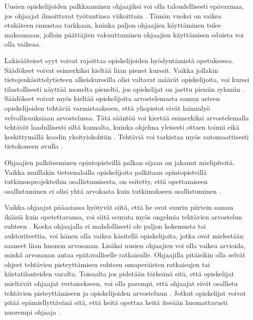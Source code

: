 \documentclass[finnish]{tktltiki2}
\theoremstyle{definition}
\theoremstyle{remark}
\begin{document}
Uusien opiskelijoiden palkkaaminen ohjaajiksi voi olla taloudellisesti epävarmaa, jos ohjaajat ilmoittavat työtuntinsa viikoittain \cite{Reges03}. Tämän vuoksi on vaikea etukäteen ennustaa tarkkaan, kuinka paljon ohjaajien käyttäminen tulee maksamaan, jolloin päättäjien vakuuttaminen ohjaajien käyttämisen eduista voi olla vaikeaa. \par

Lakisääteiset syyt voivat rajoittaa opiskelijoiden hyödyntämistä opetuksessa. Säädökset voivat esimerkiksi kieltää liian pienet kurssit. Vaikka jollakin tietojenkäsittelytieteen alkeiskurssilla olisi valtavat määrät opiskelijoita, voi kurssi tilastollisesti näyttää monelta pieneltä, jos opiskelijat on jaettu pieniin ryhmiin \cite{Reges03}. Säädökset voivat myös kieltää opiskelijoita arvostelemasta saman asteen opiskelijoiden tehtäviä varmistaakseen, että yliopistot eivät laiminlyö velvollisuuksiaan arvostelussa. Tätä sääntöä voi kiertää esimerkiksi arvostelemalla tehtävät laadullisesti siltä kannalta, kuinka ohjelma yleisesti ottaen toimii eikä keskittymällä koodin yksityiskohtiin \cite{Dickson11}. Tehtäviä voi tarkistaa myös automaattisesti tietokoneen avulla \cite{Vihavainen}. \par

Ohjaajien palkitseminen opintopisteillä palkan sijaan on jakanut mielipiteitä. Vaikka muillakin tieteenaloilla opiskelijoita palkitaan opintopisteillä tutkimusprojekteihin osallistumisesta, on esitetty, että opettamiseen osallistuminen ei olisi yhtä arvokasta kuin tutkimukseen osallistuminen \cite{Reges88}. \par

Vaikka ohjaajat pääasiassa hyötyvät siitä, että he ovat suurin piirtein saman ikäisiä kuin opetettavansa, voi siitä seurata myös ongelmia tehtävien arvostelun suhteen \cite{Roberts95}. Koska ohjaajalla ei mahdollisesti ole paljon kokemusta tai auktoriteettia, voi hänen olla vaikea käsitellä opiskelijoita, jotka ovat mielestään saaneet liian huonon arvosanan. Lisäksi uusien ohjaajien voi olla vaikea arvioida, minkä arvosanan antaa epätavalliselle ratkaisulle. Ohjaajilla pitäisikin olla selvät ohjeet tehtävien pisteyttämisen suhteen omaperäisten ratkaisujen tai kiistatilanteiden varalta. Toisaalta jos pidetään tärkeänä sitä, että opiskelijat mieltävät ohjaajat vertaisekseen, voi olla parempi, että ohjaajat eivät osallistu tehtävien pisteyttämiseen ja opiskelijoiden arvosteluun \cite{Morgan02}. Jotkut opiskelijat voivat pitää epämiellyttävänä sitä, että heitä opettaa heitä itseään huomattavasti nuorempi ohjaaja \cite{Sperry08}. \par
\end{document}
